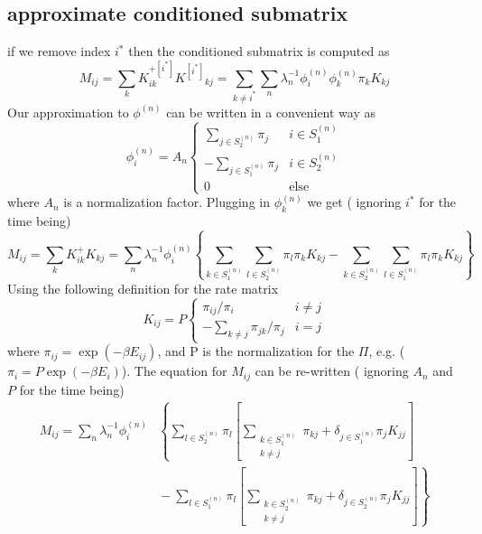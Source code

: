 \documentclass[a4paper]{article}
\newcommand{\evec}[2]{\phi^{(#2)}_{#1}}
\newcommand{\subK}{K^{[i^{*}]}}
\begin{document}
\subsection{approximate conditioned submatrix}
if we remove index $i^{*}$ then the conditioned submatrix is computed as
\begin{equation}
M_{ij} = \sum_{k} K^{+[i^{*}]}_{ik} \subK{}_{kj}  = 
\sum_{k \ne i^{*}} \sum_n \lambda_n^{-1} \evec{i}{n} \evec{k}{n} \pi_k K_{kj}
\end{equation}
Our approximation to $\phi^{(n)}$ can be written in a convenient way as
\begin{equation}
\evec{i}{n} = A_n
\begin{cases}
 \sum_{j \in S^{(n)}_2} \pi_{j} & i \in S^{(n)}_1 \\
-\sum_{j \in S^{(n)}_1} \pi_{j} & i \in S^{(n)}_2 \\
0 & \text{else}
\end{cases}
\end{equation}
where $A_n$ is a normalization factor.  Plugging in $\evec{k}{n}$ we get ({\color{red} ignoring $i^{*}$ for the time being})
\begin{equation}
M_{ij} = \sum_{k} K^{+}_{ik} K_{kj}  = 
\sum_n \lambda_n^{-1} \evec{i}{n} \left\{ 
  \sum_{k \in S_1^{(n)}} 
  \sum_{l \in S_2^{(n)}} 
  \pi_l
  \pi_k K_{kj}
  -
  \sum_{k \in S_2^{(n)}} 
  \sum_{l \in S_1^{(n)}} 
  \pi_l
  \pi_k K_{kj}
\right\}
\end{equation}
Using the following definition for the rate matrix 
\begin{equation}
K_{ij} = P
\begin{cases}
 \pi_{ij} / \pi_i & i \ne j \\
-\sum_{k \ne j} \pi_{jk} / \pi_j & i = j
\end{cases}
\end{equation}
where $\pi_{ij} = \exp (-\beta E_{ij})$, and P is the normalization for the $\Pi$, e.g. ($\pi_i = P \exp (-\beta E_i)$).
The equation for $M_{ij}$ can be re-written  ({\color{red} ignoring $A_n$ and $P$ for the time being})
\begin{align}
M_{ij} = 
\sum_n \lambda_n^{-1} \evec{i}{n} 
& \left\{ 
  \sum_{l \in S_2^{(n)}}   \pi_l
  \left[
  \sum_{\substack{k \in S_1^{(n)} \\ k \ne j}} 
  \pi_{kj}
   + \delta_{j \in S_1^{(n)}}
   \pi_j K_{jj}
  \right]
  \right. \\ & \left. 
  {} - \sum_{l \in S_1^{(n)}} \pi_l
  \left[
  \sum_{\substack{k \in S_2^{(n)} \\ k \ne j}} 
  \pi_{kj}
   + \delta_{j \in S_2^{(n)}}
   \pi_j K_{jj}
  \right]
\right\}
\end{align}
\end{document}
